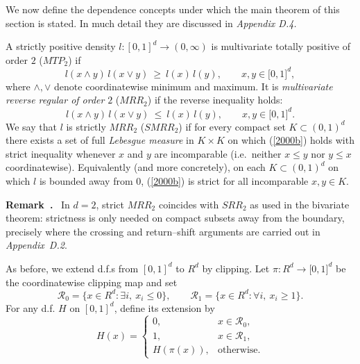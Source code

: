 \documentclass[onecolumn]{article}
\newtheorem{definition}[theorem]{Definition}
\let\olddefinition\definition
\let\endolddefinition\enddefinition
\renewenvironment{definition}{\olddefinition\normalfont}{\endolddefinition}
\newenvironment{remark}{  \refstepcounter{theorem}  \par\medskip\noindent\textbf{Remark~\thetheorem.}\rmfamily\ }{\par\medskip}
\begin{document}
We now define the dependence concepts under which the main theorem of this
section is stated. In much detail they are discussed in \textit{Appendix D.4.%
}

\begin{definition}
\label{MTP2-SMRR2} A strictly positive density $l:[0,1]^{d}\rightarrow
(0,\infty )$ is multivariate totally positive of order $2$ ($MTP_{2}$) if 
\begin{equation}
l(x\wedge y)\,l(x\vee y)\ \geq \ l(x)\,l(y),\qquad x,y\in \lbrack 0,1]^{d},
\label{2000a}
\end{equation}%
where $\wedge ,\vee $ denote coordinatewise minimum and maximum. It is 
\textit{multivariate reverse regular of order }$2$ ($MRR_{2}$) if the
reverse inequality holds: 
\begin{equation}
l(x\wedge y)\,l(x\vee y)\ \leq \ l(x)\,l(y),\qquad x,y\in \lbrack 0,1]^{d}.
\label{2000b}
\end{equation}%
We say that $l$ is strictly $MRR_{2}$ ($SMRR_{2}$) if for every compact set $%
K\subset (0,1)^{d}$ there exists a set of full \textit{Lebesgue measure} in $%
K\times K$ on which (\ref{2000b}) holds with strict inequality whenever $x$
and $y$ are incomparable (i.e.\ neither $x\leq y$ nor $y\leq x$
coordinatewise). Equivalently (and more concretely), on each $K\subset
(0,1)^{d}$ on which $l$ is bounded away from $0$, (\ref{2000b}) is strict
for all incomparable $x,y\in K$.
\end{definition}

\begin{remark}
\label{rem:SMRR2-analogue} In $d=2$, strict $MRR_{2}$ coincides with $%
SRR_{2} $ as used in the bivariate theorem: strictness is only needed on
compact subsets away from the boundary, precisely where the crossing and
return--shift arguments are carried out in \textit{Appendix~D.2}.
\end{remark}

As before, we extend d.f.s from $[0,1]^{d}$ to $R^{d}$ by clipping. Let $\pi
:R^{d}\rightarrow \lbrack 0,1]^{d}$ be the coordinatewise clipping map and
set 
\begin{equation}
\mathcal{R}_{0}=\{x\in R^{d}:\exists i,\ x_{i}\leq 0\},\qquad \mathcal{R}%
_{1}=\{x\in R^{d}:\forall i,\ x_{i}\geq 1\}.  \label{2000}
\end{equation}%
For any d.f. $H$ on $[0,1]^{d}$, define its extension by 
\begin{equation}
H(x)=%
\begin{cases}
0, & x\in \mathcal{R}_{0}, \\ 
1, & x\in \mathcal{R}_{1}, \\ 
H(\pi (x)), & \text{otherwise}.%
\end{cases}
\label{2001}
\end{equation}
\end{document}
